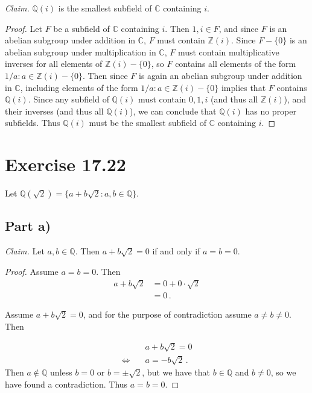 \documentclass{abrice}
\newcommand{\Z}{\mathbb{Z}}
\newcommand{\Q}{\mathbb{Q}}
\renewcommand{\C}{\mathbb{C}}
\begin{document}
\emph{Claim.} $\Q(i)$ is the smallest subfield of $\C$ containing $i$.

\begin{proof}
  Let $F$ be a subfield of $\C$ containing $i$. Then $1,i \in F$, and since $F$
  is an abelian subgroup under addition in $\C$, $F$ must contain $\Z(i)$. Since
  $F - \{0\}$ is an abelian subgroup under multiplication in $\C$, $F$ must
  contain multiplicative inverses for all elements of $\Z(i) - \{0\}$, so $F$
  contains all elements of the form $1/a : a \in \Z(i) - \{0\}$. Then since $F$
  is again an abelian subgroup under addition in $\C$, including elements of the
  form $1/a : a \in \Z(i) - \{0\}$ implies that $F$ contains $\Q(i)$. Since any
  subfield of $\Q(i)$ must contain $0, 1, i$ (and thus all $\Z(i)$), and their
  inverses (and thus all $\Q(i)$), we can conclude that $\Q(i)$ has no proper
  subfields. Thus $\Q(i)$ must be the smallest subfield of $\C$ containing $i$.
\end{proof}

\section{Exercise 17.22}

Let $\Q(\sqrt 2) = \{a + b\sqrt 2 : a,b \in \Q\}$.

\subsection{Part a)}

\emph{Claim.} Let $a,b \in \Q$. Then $a + b\sqrt 2 = 0$ if and only if $a = b =
0$.

\begin{proof}
  Assume $a = b =0$. Then
  \begin{align*}
    a + b \sqrt 2 &= 0 + 0 \cdot \sqrt 2 \\
                  &= 0\, .
  \end{align*}

  Assume $a + b \sqrt 2 = 0$, and for the purpose of contradiction assume $a
  \neq b \neq 0$. Then

  \begin{align*}
    &a + b\sqrt 2 = 0 \\ \Longleftrightarrow \quad
    &a = -b \sqrt{2}\, .
  \end{align*}
  Then $a \notin \Q$ unless $b = 0$ or $b = \pm \sqrt 2$, but we have that $b \in \Q$
  and $b \neq 0$, so we have found a contradiction. Thus $a = b = 0$.
\end{proof}
\end{document}
